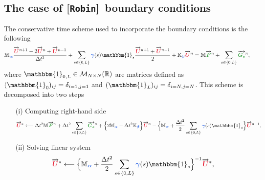 \documentclass[11pt,a4paper]{article}
\newcommand{\unknown}[1]{\bm{{\color{myred}{#1}}}}
\newcommand{\param}[1]{\bm{{\color{myhyperblue}{#1}}}}
\newcommand{\data}[1]{\bm{{\color{mygreen}{#1}}}}
\newcommand{\keyword}[1]{[\texttt{\textbf{#1}}]\!\,}
\begin{document}
\subsection{The case of \keyword{Robin} boundary conditions}
The conservative time scheme used to incorporate the boundary conditions is the following
\begin{equation*}
\mathbb{M}_{\param{\alpha}}\dfrac{\overrightarrow{\unknown{U}}^{n+1} - 2\overrightarrow{\unknown{U}}^{n} + \overrightarrow{\unknown{U}}^{n-1}}{\Delta t^2} + \sum_{s\in\{0, L\}} \param{\gamma}(s)\mathbbm{1}_s \dfrac{\overrightarrow{\unknown{U}}^{n+1} + \overrightarrow{\unknown{U}}^{n-1}}{2} + \mathbb{K}_{\param{\beta}} \overrightarrow{\unknown{U}}^{n} = \mathbb{M} \overrightarrow{\data{F}}^n + \sum_{s\in\{0, L\}}  \overrightarrow{\data{G_s}}^n,
\end{equation*}
where $\mathbbm{1}_{0, L} \in \mathcal{M}_{N\times N}(\mathbb{R})$ are matrices defined as $(\mathbbm{1}_{0})_{ij} = \delta_{i=1, j=1}$ and $(\mathbbm{1}_{L})_{ij} = \delta_{i=N, j=N}$. This scheme is decomposed into two steps
\begin{itemize}
\item[(i)] Computing right-hand side
\begin{equation*}
\overrightarrow{\unknown{U}}^* \longleftarrow \Delta t^2 \mathbb{M} \overrightarrow{\data{F}}^n + \Delta t^2 \sum_{s\in\{0, L\}}  \overrightarrow{\data{G_s}}^n + \Big\{ 2 \mathbb{M}_{\param{\alpha}} - \Delta t^2 \mathbb{K}_{\param{\beta}} \Big\} \overrightarrow{\unknown{U}}^{n} - \Big\{ \mathbb{M}_{\param{\alpha}} + \dfrac{\Delta t^2}{2} \sum_{s\in\{0, L\}} \param{\gamma}(s)\mathbbm{1}_s \Big\} \overrightarrow{\unknown{U}}^{n-1},
\end{equation*}
\item[(ii)] Solving linear system
\begin{equation*}
\overrightarrow{\unknown{U}}^* \longleftarrow \Big\{\mathbb{M}_{\param{\alpha}} + \dfrac{\Delta t^2}{2} \sum_{s\in\{0, L\}} \param{\gamma}(s)\mathbbm{1}_s \Big\}^{-1} \overrightarrow{\unknown{U}}^*,
\end{equation*}
\end{itemize}
\end{document}
